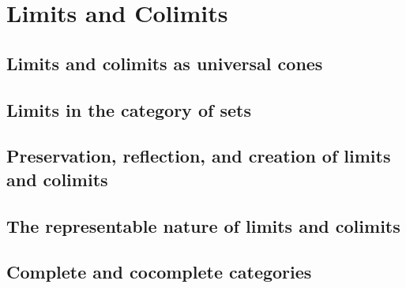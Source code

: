 \documentclass[../main]{subfiles}
\begin{document}
\chapter{Limits and Colimits}
\section{Limits and colimits as universal cones}














\pagebreak
\section{Limits in the category of sets}







\pagebreak
\section{Preservation, reflection, and creation of limits and colimits}







\pagebreak
\section{The representable nature of limits and colimits}





\pagebreak
\section{Complete and cocomplete categories}







\end{document}
